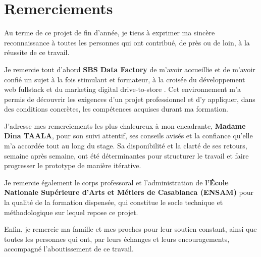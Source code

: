 \chapter*{Remerciements}

Au terme de ce projet de fin d'année, je tiens à exprimer ma sincère
reconnaissance à toutes les personnes qui ont contribué, de près ou de loin,
à la réussite de ce travail.

Je remercie tout d'abord \textbf{SBS Data Factory} de m'avoir accueillie et
de m'avoir confié un sujet à la fois stimulant et formateur, à la croisée du
développement web fullstack et du marketing digital \og drive-to-store \fg{}.
Cet environnement m'a permis de découvrir les exigences d'un projet
professionnel et d'y appliquer, dans des conditions concrètes, les
compétences acquises durant ma formation.

J'adresse mes remerciements les plus chaleureux à mon encadrante,
\textbf{Madame Dina TAALA}, pour son suivi attentif, ses conseils avisés et
la confiance qu'elle m'a accordée tout au long du stage. Sa disponibilité et
la clarté de ses retours, semaine après semaine, ont été déterminantes pour
structurer le travail et faire progresser le prototype de manière
itérative.

Je remercie également le corps professoral et l'administration de
\textbf{l'École Nationale Supérieure d'Arts et Métiers de Casablanca
(ENSAM)} pour la qualité de la formation dispensée, qui constitue le socle
technique et méthodologique sur lequel repose ce projet.

Enfin, je remercie ma famille et mes proches pour leur soutien constant, ainsi
que toutes les personnes qui ont, par leurs échanges et leurs
encouragements, accompagné l'aboutissement de ce travail.
